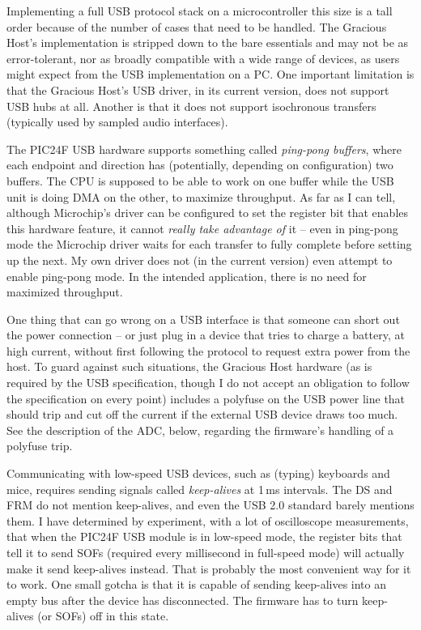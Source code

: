Implementing a full USB protocol stack on a microcontroller this size is a
tall order because of the number of cases that need to be handled.  The
Gracious Host's implementation is stripped down to the bare essentials and
may not be as error-tolerant, nor as broadly compatible with a wide range of
devices, as users might expect from the USB implementation on a PC.  One
important limitation is that the Gracious Host's USB driver, in its current
version, does not support USB hubs at all.  Another is that it does not
support isochronous transfers (typically used by sampled audio interfaces).

The PIC24F USB hardware supports something called \emph{ping-pong buffers},
where each endpoint and direction has (potentially, depending on
configuration) two buffers.  The CPU is supposed to be able to work on one
buffer while the USB unit is doing DMA on the other, to maximize throughput. 
As far as I can tell, although Microchip's driver can be configured to set
the register bit that enables this hardware feature, it cannot \emph{really
take advantage of} it -- even in ping-pong mode the Microchip driver waits
for each transfer to fully complete before setting up the next.  My own
driver does not (in the current version) even attempt to enable ping-pong
mode.  In the intended application, there is no need for maximized
throughput.

One thing that can go wrong on a USB interface is that someone can short out
the power connection -- or just plug in a device that tries to charge a
battery, at high current, without first following the protocol to request
extra power from the host.  To guard against such situations, the Gracious
Host hardware (as is required by the USB specification, though I do not
accept an obligation to follow the specification on every point) includes a
polyfuse on the USB power line that should trip and cut off the current if
the external USB device draws too much.  See the description of the ADC,
below, regarding the firmware's handling of a polyfuse trip.

Communicating with low-speed USB devices, such as (typing) keyboards and
mice, requires sending signals called \emph{keep-alives} at 1\,ms intervals. 
The DS and FRM do not mention keep-alives, and even the USB 2.0 standard
barely mentions them.  I have determined by experiment, with a lot of
oscilloscope measurements, that when the PIC24F USB module is in low-speed
mode, the register bits that tell it to send SOFs (required every
millisecond in full-speed mode) will actually make it send keep-alives
instead.  That is probably the most convenient way for it to work.  One
small gotcha is that it is capable of sending keep-alives into an empty bus
after the device has disconnected.  The firmware has to turn keep-alives (or
SOFs) off in this state.

